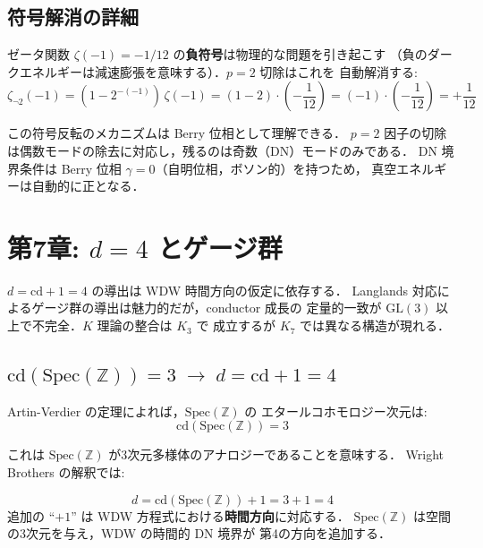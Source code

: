 \documentclass[11pt,a4paper]{article}
\begin{document}
\subsection{符号解消の詳細}

ゼータ関数 $\zeta(-1) = -1/12$ の\textbf{負符号}は物理的な問題を引き起こす
（負のダークエネルギーは減速膨張を意味する）．$p=2$ 切除はこれを
自動解消する:
\begin{equation}
\zeta_{\neg 2}(-1) = (1 - 2^{-(-1)})\,\zeta(-1)
= (1 - 2)\cdot\left(-\frac{1}{12}\right)
= (-1)\cdot\left(-\frac{1}{12}\right)
= +\frac{1}{12}
\end{equation}

この符号反転のメカニズムは Berry 位相として理解できる．
$p=2$ 因子の切除は偶数モードの除去に対応し，残るのは奇数（DN）モードのみである．
DN 境界条件は Berry 位相 $\gamma = 0$（自明位相，ボソン的）を持つため，
真空エネルギーは自動的に正となる．

\newpage
\section{第7章: $d=4$ とゲージ群}

\begin{statusbox}
$d = \mathrm{cd}+1 = 4$ の導出は WDW 時間方向の仮定に依存する．
Langlands 対応によるゲージ群の導出は魅力的だが，conductor 成長の
定量的一致が $\mathrm{GL}(3)$ 以上で不完全．$K$ 理論の整合は $K_3$ で
成立するが $K_7$ では異なる構造が現れる．
\end{statusbox}

\subsection{$\mathrm{cd}(\mathrm{Spec}(\mathbb{Z})) = 3 \;\to\; d = \mathrm{cd} + 1 = 4$}

Artin-Verdier の定理によれば，$\mathrm{Spec}(\mathbb{Z})$ の
エタールコホモロジー次元は:
\begin{equation}
\mathrm{cd}(\mathrm{Spec}(\mathbb{Z})) = 3
\end{equation}

これは $\mathrm{Spec}(\mathbb{Z})$ が3次元多様体のアナロジーであることを意味する．
Wright Brothers の解釈では:

\begin{keyresult}[時空次元の導出]
\begin{equation}
d = \mathrm{cd}(\mathrm{Spec}(\mathbb{Z})) + 1 = 3 + 1 = 4
\end{equation}
追加の ``$+1$'' は WDW 方程式における\textbf{時間方向}に対応する．
$\mathrm{Spec}(\mathbb{Z})$ は空間の3次元を与え，WDW の時間的 DN 境界が
第4の方向を追加する．
\end{keyresult}
\end{document}
